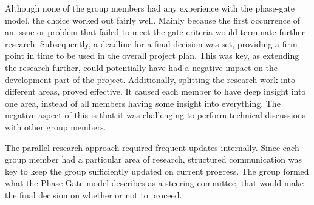 Although none of the group members had any experience with the phase-gate model, the choice worked out fairly well. Mainly because the first occurrence of an issue or problem that failed to meet the gate criteria would terminate further research. Subsequently, a deadline for a final decision was set, providing a firm point in time to be used in the overall project plan. This was key, as extending the research further, could potentially have had a negative impact on the development part of the project. Additionally, splitting the research work into different areas, proved effective. It caused each member to have deep insight into one area, instead of all members having some insight into everything. The negative aspect of this is that it was challenging to perform technical discussions with other group members.

The parallel research approach required frequent updates internally. Since each group member had a particular area of research, structured communication was key to keep the group sufficiently updated on current progress. The group formed what the Phase-Gate model describes as a steering-committee, that would make the final decision on whether or not to proceed. 



